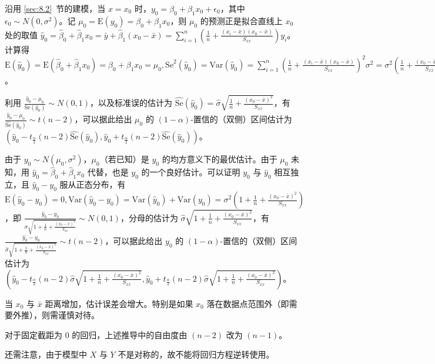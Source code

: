 \documentclass[../main.tex]{subfiles}
\begin{document}
沿用 \ref{sec:8.2}~节的建模，当 $x=x_0$ 时，$y_0=\beta_0+\beta_1x_0+\epsilon_0$，其中 $\epsilon_0\sim N(0,\sigma^2)$。记 $\mu_0=\mathrm E(y_0)=\beta_0+\beta_1x_0$，则 $\mu_0$ 的预测正是拟合直线上 $x_0$ 处的取值 $\hat y_0=\hat\beta_0+\hat\beta_1x_0=\bar y+\hat\beta_1(x_0-\bar x)=\sum_{i=1}^n(\frac1n+\frac{(x_i-\bar x)(x_0-\bar x)}{S_{xx}})y_i$。计算得 $\mathrm E(\hat y_0)=\mathrm E(\hat\beta_0+\hat\beta_1x_0)=\beta_0+\beta_1x_0=\mu_0,\mathrm{Se}^2(\hat y_0)=\mathrm{Var}(\hat y_0)=\sum_{i=1}^n(\frac1n+\frac{(x_i-\bar x)(x_0-\bar x)}{S_{xx}})^2\sigma^2=\sigma^2(\frac1n+\frac{(x_0-\bar x)^2}{S_{xx}})$。

利用 $\frac{\hat y_0-\mu_0}{\mathrm{Se}(\hat y_0)}\sim N(0,1)$，以及标准误的估计为 $\widehat{\mathrm{Se}}(\hat y_0)=\hat\sigma\sqrt{\frac1n+\frac{(x_0-\bar x)^2}{S_{xx}}}$，有 $\frac{\hat y_0-\mu_0}{\widehat{\mathrm{Se}}(\hat y_0)}\sim t(n-2)$，可以据此给出 $\mu_0$ 的 $(1-\alpha)$-置信的（双侧）区间估计为 $(\hat y_0-t_{\frac\alpha2}(n-2)\widehat{\mathrm{Se}}(\hat y_0),\hat y_0+t_{\frac\alpha2}(n-2)\widehat{\mathrm{Se}}(\hat y_0))$。

由于 $y_0\sim N(\mu_0,\sigma^2)$，$\mu_0$（若已知）是 $y_0$ 的均方意义下的最优估计。由于 $\mu_0$ 未知，用 $\hat y_0=\hat\beta_0+\hat\beta_1x_0$ 代替，也是 $y_0$ 的一个良好估计。可以证明 $y_0$ 与 $\hat y_0$ 相互独立，且 $\hat y_0-y_0$ 服从正态分布，有 $\mathrm E(\hat y_0-y_0)=0,\mathrm{Var}(\hat y_0-y_0)=\mathrm{Var}(\hat y_0)+\mathrm{Var}(y_0)=\sigma^2(1+\frac1n+\frac{(x_0-\bar x)^2}{S_{xx}})$，即 $\frac{\hat y_0-y_0}{\sigma\sqrt{1+\frac1n+\frac{(x_0-\bar x)^2}{S_{xx}}}}\sim N(0,1)$，分母的估计为 $\hat\sigma\sqrt{1+\frac1n+\frac{(x_0-\bar x)^2}{S_{xx}}}$，有 $\frac{\hat y_0-y_0}{\hat\sigma\sqrt{1+\frac1n+\frac{(x_0-\bar x)^2}{S_{xx}}}}\sim t(n-2)$，可以据此给出 $y_0$ 的 $(1-\alpha)$-置信的（双侧）区间估计为 $(\hat y_0-t_{\frac\alpha2}(n-2)\hat\sigma\sqrt{1+\frac1n+\frac{(x_0-\bar x)^2}{S_{xx}}},\hat y_0+t_{\frac\alpha2}(n-2)\hat\sigma\sqrt{1+\frac1n+\frac{(x_0-\bar x)^2}{S_{xx}}})$。


当 $x_0$ 与 $\bar x$ 距离增加，估计误差会增大。特别是如果 $x_0$ 落在数据点范围外（即需要外推），则需谨慎对待。

对于固定截距为 $0$ 的回归，上述推导中的自由度由 $(n-2)$ 改为 $(n-1)$。

还需注意，由于模型中 $X$ 与 $Y$ 不是对称的，故不能将回归方程逆转使用。


\end{document}
